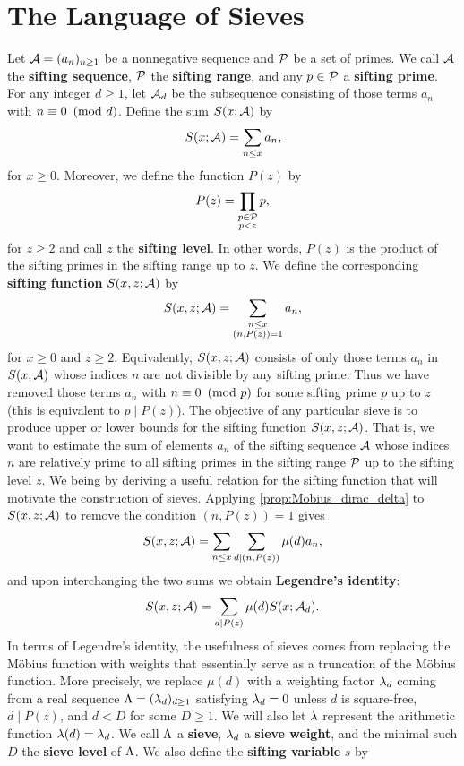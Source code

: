 \documentclass[12pt,oneside]{book}
\begin{document}
  \section{The Language of Sieves}
    Let $\mathcal{A} = (a_{n})_{n \ge 1}$ be a nonnegative sequence and $\mathcal{P}$ be a set of primes. We call $\mathcal{A}$ the \textbf{sifting sequence}, $\mathcal{P}$ the \textbf{sifting range}, and any $p \in \mathcal{P}$ a \textbf{sifting prime}. For any integer $d \ge 1$, let $\mathcal{A}_{d}$ be the subsequence consisting of those terms $a_{n}$ with $n \equiv 0 \ \left(\text{mod }d\right)$. Define the sum $S(x;\mathcal{A})$ by
    \[
      S(x;\mathcal{A}) = \sum_{\substack{n \le x}}a_{n},
    \]
    for $x \ge 0$.  Moreover, we define the function $P(z)$ by
    \[
      P(z) = \prod_{\substack{p \in \mathcal{P} \\ p < z}}p,
    \]
    for $z \ge 2$ and call $z$ the \textbf{sifting level}. In other words, $P(z)$ is the product of the sifting primes in the sifting range up to $z$. We define the corresponding \textbf{sifting function} $S(x,z;\mathcal{A})$ by
    \[
      S(x,z;\mathcal{A}) = \sum_{\substack{n \le x \\ (n,P(z)) = 1}}a_{n},
    \]
    for $x \ge 0$ and $z \ge 2$. Equivalently, $S(x,z;\mathcal{A})$ consists of only those terms $a_{n}$ in $S(x;\mathcal{A})$ whose indices $n$ are not divisible by any sifting prime. Thus we have removed those terms $a_{n}$ with $n \equiv 0 \ \left(\text{mod }p\right)$ for some sifting prime $p$ up to $z$ (this is equivalent to $p \mid P(z)$). The objective of any particular sieve is to produce upper or lower bounds for the sifting function $S(x,z;\mathcal{A})$. That is, we want to estimate the sum of elements $a_{n}$ of the sifting sequence $\mathcal{A}$ whose indices $n$ are relatively prime to all sifting primes in the sifting range $\mathcal{P}$ up to the sifting level $z$. We being by deriving a useful relation for the sifting function that will motivate the construction of sieves. Applying \cref{prop:Mobius_dirac_delta} to $S(x,z;\mathcal{A})$ to remove the condition $(n,P(z)) = 1$ gives
    \[
      S(x,z;\mathcal{A}) = \sum_{n \le x}\sum_{d \mid (n,P(z))}\mu(d)a_{n},
    \]
    and upon interchanging the two sums we obtain \textbf{Legendre's identity}:
    \[
      S(x,z;\mathcal{A}) = \sum_{d \mid P(z)}\mu(d)S(x;\mathcal{A}_{d}).
    \]
    In terms of Legendre's identity, the usefulness of sieves comes from replacing the M\"obius function with weights that essentially serve as a truncation of the M\"obius function. More precisely, we replace $\mu(d)$ with a weighting factor $\lambda_{d}$ coming from a real sequence $\Lambda = (\lambda_{d})_{d \ge 1}$ satisfying $\lambda_{d} = 0$ unless $d$ is square-free, $d \mid P(z)$, and $d < D$ for some $D \ge 1$. We will also let $\lambda$ represent the arithmetic function $\lambda(d) = \lambda_{d}$. We call $\Lambda$ a \textbf{sieve}, $\lambda_{d}$ a \textbf{sieve weight}, and the minimal such $D$ the \textbf{sieve level} of $\Lambda$. We also define the \textbf{sifting variable} $s$ by
\end{document}
